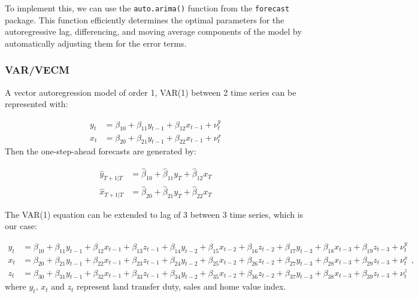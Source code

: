 \documentclass[
  11pt,
  a4paper,
]{article}
\begin{document}
To implement this, we can use the \texttt{auto.arima()} function from
the \texttt{forecast} package. This function efficiently determines the
optimal parameters for the autoregressive lag, differencing, and moving
average components of the model by automatically adjusting them for the
error terms.

\subsubsection{VAR/VECM}\label{varvecm}

A vector autoregression model of order 1, VAR(1) between 2 time series
can be represented with:

\[
\begin{aligned}
y_t &= \beta_{10} + \beta_{11} y_{t-1} + \beta_{12} x_{t-1} + \nu_t^y \\
x_t &= \beta_{20} + \beta_{21} y_{t-1} + \beta_{22} x_{t-1} + \nu_t^x
\end{aligned}
\] Then the one-step-ahead forecasts are generated by:

\[
\begin{aligned}
\hat{y}_{T+1|T} &= \hat{\beta}_{10} + \hat{\beta}_{11} y_{T} + \hat{\beta}_{12} x_{T} \\
\hat{x}_{T+1|T} &= \hat{\beta}_{20} + \hat{\beta}_{21} y_{T} + \hat{\beta}_{22} x_{T}
\end{aligned}
\]

The VAR(1) equation can be extended to lag of 3 between 3 time series,
which is our case:

\[
\begin{aligned}
y_t &= \beta_{10} + \beta_{11} y_{t-1} + \beta_{12} x_{t-1} + \beta_{13} z_{t-1} + \beta_{14} y_{t-2} + \beta_{15} x_{t-2} + \beta_{16} z_{t-2} + \beta_{17} y_{t-3} + \beta_{18} x_{t-3} + \beta_{19} z_{t-3} + \nu_t^y \\
x_t &= \beta_{20} + \beta_{21} y_{t-1} + \beta_{22} x_{t-1} + \beta_{23} z_{t-1} + \beta_{24} y_{t-2} + \beta_{25} x_{t-2} + \beta_{26} z_{t-2} + \beta_{27} y_{t-3} + \beta_{28} x_{t-3} + \beta_{29} z_{t-3} + \nu_t^x \\
z_t &= \beta_{30} + \beta_{31} y_{t-1} + \beta_{32} x_{t-1} + \beta_{33} z_{t-1} + \beta_{34} y_{t-2} + \beta_{35} x_{t-2} + \beta_{36} z_{t-2} + \beta_{37} y_{t-3} + \beta_{38} x_{t-3} + \beta_{39} z_{t-3} + \nu_t^z
\end{aligned},
\] where \(y_t\), \(x_t\) and \(z_t\) represent land transfer duty,
sales and home value index.
\end{document}
